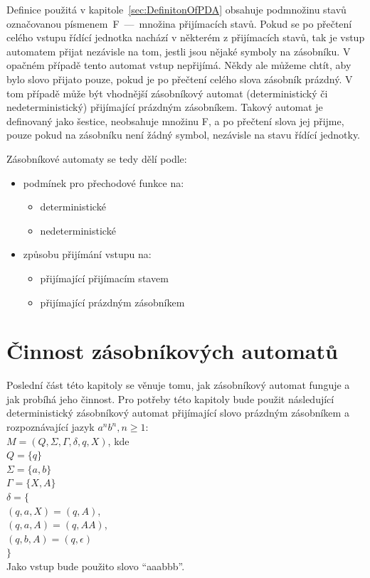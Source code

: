 Definice použitá v kapitole~\ref{sec:DefinitonOfPDA} obsahuje podmnožinu stavů označovanou písmenem~F~---~množina přijímacích stavů. Pokud se po přečtení celého vstupu řídící jednotka nachází v některém z přijímacích stavů, tak je vstup automatem přijat nezávisle na tom, jestli jsou nějaké symboly na zásobníku. V opačném případě tento automat vstup nepřijímá. Někdy ale můžeme chtít, aby bylo slovo přijato pouze, pokud je po přečtení celého slova zásobník prázdný. V tom případě může být vhodnější zásobníkový automat (deterministický či nedeterministický) přijímající prázdným zásobníkem. Takový automat je definovaný jako šestice, neobsahuje množinu F, a po přečtení slova jej přijme, pouze pokud na zásobníku není žádný symbol, nezávisle na stavu řídící jednotky.

Zásobníkové automaty se tedy dělí podle:
\begin{itemize}
    \item podmínek pro přechodové funkce na:
        \begin{itemize}
            \item deterministické
            \item nedeterministické
        \end{itemize}
    \item způsobu přijímání vstupu na:
        \begin{itemize}
            \item přijímající přijímacím stavem
            \item přijímající prázdným zásobníkem
        \end{itemize}
\end{itemize}

\section{Činnost zásobníkových automatů}

Poslední část této kapitoly se věnuje tomu, jak zásobníkový automat funguje a jak probíhá jeho činnost. Pro potřeby této kapitoly bude použit následující deterministický zásobníkový automat přijímající slovo prázdným zásobníkem a rozpoznávající jazyk $a^{n}b^{n}, n \ge 1$:\\
$M = (Q, \Sigma, \Gamma, \delta, q, X)$, kde \\
\indent$Q = \{q\}$\\
\indent$\Sigma = \{a,b\}$\\
\indent$\Gamma = \{X,A\}$\\
\indent$\delta = \{$\\
\indent\indent$(q,a,X) = (q,A)$,\\
\indent\indent$(q,a,A) = (q,AA)$,\\
\indent\indent$(q,b,A) = (q,\epsilon)$\\
\indent$\}$\\
Jako vstup bude použito slovo ``aaabbb''.


